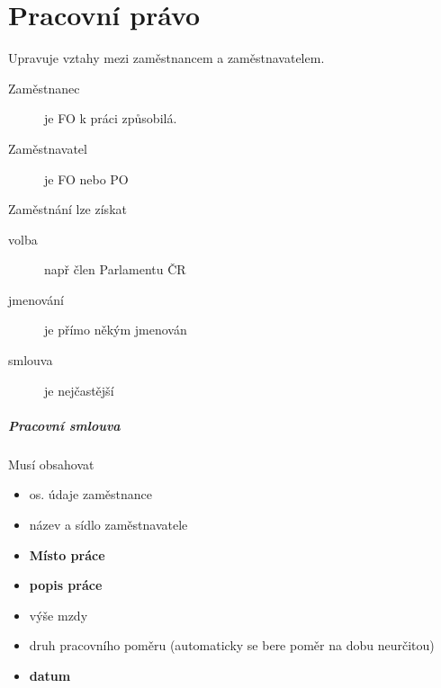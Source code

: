 \documentclass[10pt,a4paper,
twoside,%
]{report}
\begin{document}
\dotfill{} \vspace{0.6cm}

\dotfill{} \vspace{0.6cm}

\dotfill{} \vspace{0.6cm}

\dotfill{} \vspace{0.6cm}

\dotfill{} \vspace{0.6cm}

\chapter{Pracovní právo}
\begin{center}

Upravuje vztahy mezi zaměstnancem a zaměstnavatelem.
\end{center}

\begin{description}
\item[Zaměstnanec] je FO k práci způsobilá.

\item[Zaměstnavatel] je FO nebo PO
\end{description}

Zaměstnání lze získat\begin{description}
\item[volba]např člen Parlamentu ČR

\item[jmenování] je přímo někým jmenován

\item[smlouva] je nejčastější 
\end{description}

\paragraph{Pracovní smlouva} Musí obsahovat
\begin{itemize}
\item os. údaje zaměstnance
\item název a sídlo zaměstnavatele
\item \textbf{Místo práce}
\item \textbf{popis práce}
\item výše mzdy
\item druh pracovního poměru (automaticky se bere poměr na dobu neurčitou)
\item \textbf{datum}

\end{itemize}
\end{document}
